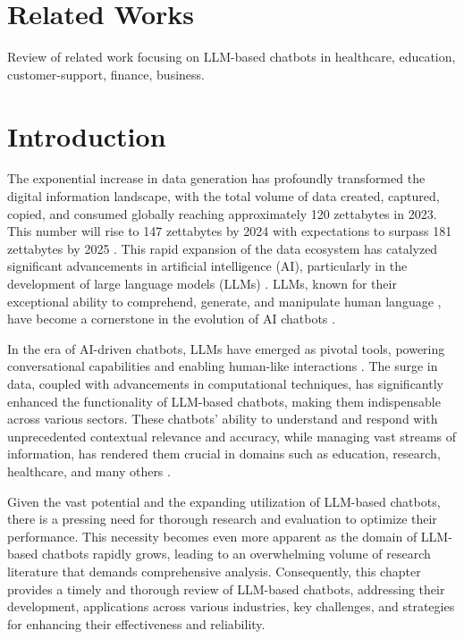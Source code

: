 \section{Related Works}
Review of related work focusing on LLM-based chatbots in healthcare, education, customer-support, finance, business.

\section{Introduction}

The exponential increase in data generation has profoundly transformed the digital information landscape, with the total volume of data created, captured, copied, and consumed globally reaching approximately 120 zettabytes in 2023. This number will rise to 147 zettabytes by 2024 with expectations to surpass 181 zettabytes by 2025 \cite{taylor2023volume}. This rapid expansion of the data ecosystem has catalyzed significant advancements in artificial intelligence (AI), particularly in the development of large language models (LLMs) \cite{zhao2023survey}. LLMs, known for their exceptional ability to comprehend, generate, and manipulate human language \cite{brown2020language}, have become a cornerstone in the evolution of AI chatbots \cite{dam2024complete}.


In the era of AI-driven chatbots, LLMs have emerged as pivotal tools, powering conversational capabilities and enabling human-like interactions \cite{koubaa2023exploring}. The surge in data, coupled with advancements in computational techniques, has significantly enhanced the functionality of LLM-based chatbots, making them indispensable across various sectors. These chatbots' ability to understand and respond with unprecedented contextual relevance and accuracy, while managing vast streams of information, has rendered them crucial in domains such as education, research, healthcare, and many others \cite{dam2024complete}.

Given the vast potential and the expanding utilization of LLM-based chatbots, there is a pressing need for thorough research and evaluation to optimize their performance. This necessity becomes even more apparent as the domain of LLM-based chatbots rapidly grows, leading to an overwhelming volume of research literature that demands comprehensive analysis. Consequently, this chapter provides a timely and thorough review of LLM-based chatbots, addressing their development, applications across various industries, key challenges, and strategies for enhancing their effectiveness and reliability. %

